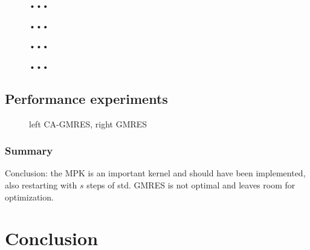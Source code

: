 \documentclass{scrartcl}
\begin{document}
\begin{figure}
	\centering
	\resizebox{.9\textwidth}{!}{}
	\caption{•••}
	\label{fig:xenon2}
\end{figure}
\begin{figure}
	\centering
	\resizebox{.9\textwidth}{!}{}
	\caption{•••}
	\label{fig:xenon2_scale}
\end{figure}
\begin{figure}
	\centering
	\resizebox{.9\textwidth}{!}{}
	\caption{•••}
	\label{fig:bcsstk18_noscale}
\end{figure}
\begin{figure}
	\centering
	\resizebox{.9\textwidth}{!}{}
	\caption{•••}
	\label{fig:bcsstk18_scale}
\end{figure}

\subsection{Performance experiments}
\begin{figure}[H]
	\centering
	\resizebox{1.0\textwidth}{!}{}
	\caption{left CA-GMRES, right GMRES}
\end{figure}

\subsubsection{Summary}
Conclusion: the MPK is an important kernel and should have been implemented, also restarting with $s$ steps of std. GMRES is not optimal and leaves room for optimization.

\section{Conclusion}
\end{document}

